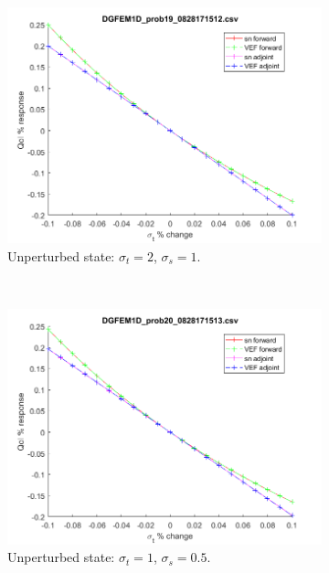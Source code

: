 \documentclass{article}
\newcommand{\sigt}{\sigma_t}
\newcommand{\sigs}{\sigma_s}
\begin{document}
\begin{figure}[H]
\label{HomoPertt}
\centering
\begin{subfigure}{.65\textwidth}
  \centering
  \includegraphics[width=.98\linewidth]{figures/19sigtSens.png}
  \caption{Unperturbed state: $\sigt=2$, $\sigs=1$. }
  \label{fig:sfig1}
\end{subfigure}%
\\
\begin{subfigure}{.65\textwidth}
  \centering
  \includegraphics[width=.98\linewidth]{figures/20sigtSens.png}
  \caption{Unperturbed state: $\sigt=1$, $\sigs=0.5$. }
  \label{fig:sfig2}
\end{subfigure}
\\
\begin{subfigure}{.65\textwidth}

\end{subfigure}
\end{figure}
\end{document}
